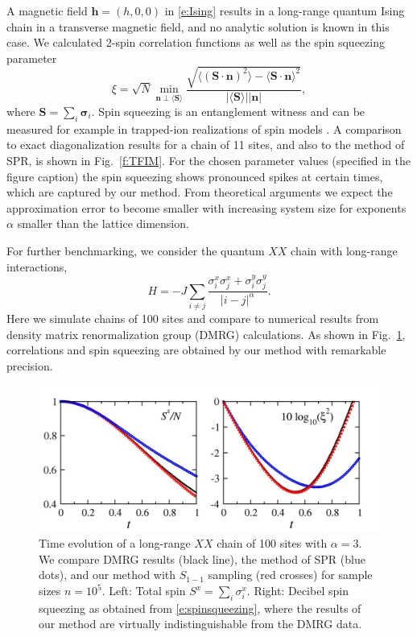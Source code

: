 \documentclass[aps,prl,showpacs,amsmath,amssymb,superscriptaddress,reprint,10pt]{revtex4-1}
\newcommand{\mvec}[1]{\boldsymbol #1}
\begin{document}
A magnetic field $\mvec{h}=(h,0,0)$ in \eqref{e:Ising} results in a long-range quantum Ising chain in a transverse magnetic field, and no analytic solution is known in this case. We calculated 2-spin correlation functions as well as the spin squeezing parameter~\cite{Wineland_etal92,*Ma_etal11}
\begin{equation}\label{e:spinsqueezing}
\xi = \sqrt{N}\min_{\mvec{n}\perp\langle\mvec{S}\rangle}\frac{\sqrt{\langle(\mvec{S}\cdot\mvec{n})^2\rangle - \langle\mvec{S}\cdot\mvec{n}\rangle^2}}{|\langle\mvec{S}\rangle||\mvec{n}|},
\end{equation}
where $\mvec{S}=\sum_i \mvec{\sigma}_i$. Spin squeezing is an entanglement witness  and can be measured for example in trapped-ion realizations of spin models \cite{Meyer_etal01,*Uys_etal12,*Hazzard_etal14}. A comparison to exact diagonalization results for a chain of 11 sites, and also to the method of SPR, is shown in Fig.~\ref{f:TFIM}. For the chosen parameter values (specified in the figure caption) the spin squeezing shows pronounced spikes at certain times, which are captured by our method. From theoretical arguments we expect the approximation error to become smaller with increasing system size for exponents $\alpha$ smaller than the lattice dimension. 

For further benchmarking, we consider the quantum $XX$ chain with long-range interactions,
\begin{equation}\label{e:XY}
H=-J\sum_{i\neq j}\frac{\sigma_i^x\sigma_j^x+\sigma_i^y\sigma_j^y}{|i-j|^\alpha}.
\end{equation}
Here we simulate chains of 100 sites and compare to numerical results from density matrix renormalization group (DMRG) calculations. As shown in Fig.~\ref{f:XX}, correlations and spin squeezing are obtained by our method with remarkable precision.

\begin{figure}\centering
\includegraphics[width=\linewidth]{./Jx05Jy05_Schach_N100_alph3_nt100000.jpg}
\caption{\label{f:XX}%
Time evolution of a long-range $XX$ chain of 100 sites with $\alpha=3$. We compare DMRG results (black line), the method of SPR (blue dots), and our method with $S_{1-1}$ sampling \cite{Note1} (red crosses) for sample sizes $n=10^5$. Left: Total spin $S^x=\sum_i\sigma_i^x$. Right: Decibel spin squeezing as obtained from \eqref{e:spinsqueezing}, where the results of our method are virtually indistinguishable from the DMRG data.
}%
\end{figure}
\end{document}

